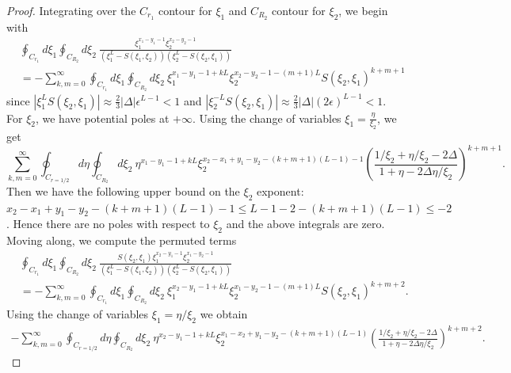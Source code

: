 \documentclass[10pt,a4paper]{amsart}
\begin{document}
\begin{proof}
Integrating over the $C_{r_1}$ contour for $\xi_1$ and $C_{R_2}$ contour for $\xi_2$, we begin with
\begin{equation}
    \begin{split}
        &\oint_{C_{r_1}}d\xi_1\oint_{C_{R_2}}d\xi_2 \ \frac{\xi_1^{x_1-y_1-1}\xi_2^{x_2-y_2-1}}{\left( \xi_1^L-S(\xi_1,\xi_2) \right)\left( \xi_2^L-S(\xi_2,\xi_1) \right)} \\
        &=-\sum_{k,m=0}^{\infty}\oint_{C_{r_1}}d\xi_1\oint_{C_{R_2}}d\xi_2 \ \xi_1^{x_1-y_1-1+kL}\xi_2^{x_2-y_2-1-(m+1)L}S(\xi_2,\xi_1)^{k+m+1} 
    \end{split}
\end{equation}
since $|\xi_1^LS(\xi_2,\xi_1)|\approx \frac23|\Delta|\epsilon^{L-1}< 1$ and $|\xi_2^{-L}S(\xi_2,\xi_1)|\approx \frac23|\Delta|(2\epsilon)^{L-1}< 1$. For $\xi_2$, we have potential poles at $+\infty$. Using the change of variables $\xi_1=\frac{\eta}{\xi_2}$, we get 
\begin{equation}
    \sum_{k,m=0}^{\infty}\oint_{C_{r=1/2}}d\eta\oint_{C_{R_2}}d\xi_2 \ \eta^{x_1-y_1-1+kL}\xi_2^{x_2-x_1+y_1-y_2-(k+m+1)(L-1)-1}\left(\frac{1/\xi_2+\eta/\xi_2-2\Delta}{1+\eta-2\Delta\eta/\xi_2}\right)^{k+m+1}.
\end{equation}
Then we have the following upper bound on the $\xi_2$ exponent: $x_2-x_1+y_1-y_2-(k+m+1)(L-1)-1\leq L-1-2-(k+m+1)(L-1) \leq -2$. Hence there are no poles with respect to $\xi_2$ and the above integrals are zero. Moving along, we compute the permuted terms
\begin{equation}
    \begin{split}
        &\oint_{C_{r_1}}d\xi_1\oint_{C_{R_2}}d\xi_2 \ \frac{S(\xi_2,\xi_1)\xi_1^{x_2-y_1-1}\xi_2^{x_1-y_2-1}}{\left( \xi_1^L-S(\xi_1,\xi_2) \right)\left( \xi_2^L-S(\xi_2,\xi_1) \right)} \\
        &=-\sum_{k,m=0}^\infty\oint_{C_{r_1}}d\xi_1\oint_{C_{R_2}}d\xi_2 \ \xi_1^{x_2-y_1-1+kL}\xi_2^{x_1-y_2-1-(m+1)L}S(\xi_2,\xi_1)^{k+m+2}.
    \end{split}
\end{equation}
 Using the change of variables $\xi_1=\eta/\xi_2$ we obtain
 \begin{equation}
     \begin{split}
         -\sum_{k,m=0}^\infty\oint_{C_{r=1/2}}d\eta\oint_{C_{R_2}}d\xi_2 \ \eta^{x_2-y_1-1+kL}\xi_2^{x_1-x_2+y_1-y_2-(k+m+1)(L-1)}\left(\frac{1/\xi_2+\eta/\xi_2-2\Delta}{1+\eta-2\Delta\eta/\xi_2}\right)^{k+m+2}.
     \end{split}
 \end{equation}

\end{proof}
\end{document}
